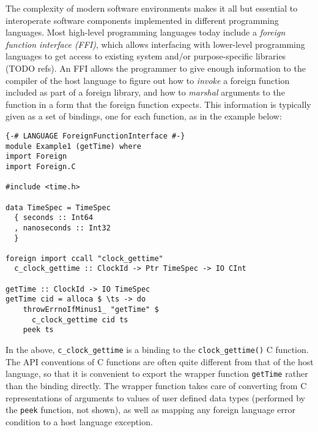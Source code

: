 \documentclass[preprint,authoryear]{sigplanconf}
\begin{document}
The complexity of modern software environments makes it all but
essential to interoperate software components implemented in different
programming languages. Most high-level programming languages today
include a {\em foreign function interface (FFI)}, which allows
interfacing with lower-level programming languages to get access to
existing system and/or purpose-specific libraries (TODO refs). An FFI
allows the programmer to give enough information to the compiler of
the host language to figure out how to {\em invoke} a foreign function
included as part of a foreign library, and how to {\em marshal}
arguments to the function in a form that the foreign function expects.
This information is typically given as a set of bindings, one for each
function, as in the example below:
\begin{verbatim}
{-# LANGUAGE ForeignFunctionInterface #-}
module Example1 (getTime) where
import Foreign
import Foreign.C

#include <time.h>

data TimeSpec = TimeSpec
  { seconds :: Int64
  , nanoseconds :: Int32
  }

foreign import ccall "clock_gettime"
  c_clock_gettime :: ClockId -> Ptr TimeSpec -> IO CInt

getTime :: ClockId -> IO TimeSpec
getTime cid = alloca $ \ts -> do
    throwErrnoIfMinus1_ "getTime" $
      c_clock_gettime cid ts
    peek ts
\end{verbatim}
In the above, \verb|c_clock_gettime| is a binding to the
\verb|clock_gettime()| C function. The API conventions of C functions
are often quite different from that of the host language, so that it
is convenient to export the wrapper function \verb|getTime| rather
than the binding directly. The wrapper function takes care of
converting from C representations of arguments to values of user
defined data types (performed by the \verb|peek| function, not shown),
as well as mapping any foreign language error condition to a host
language exception.
\end{document}
